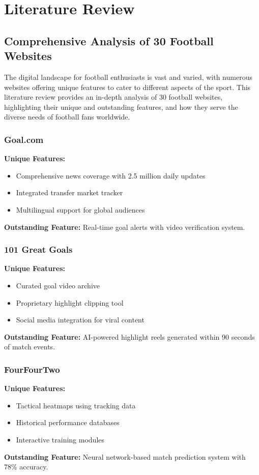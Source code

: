 \chapter{Literature Review}
\label{chap:literature-review}

\section{Comprehensive Analysis of 30 Football Websites}
The digital landscape for football enthusiasts is vast and varied, with numerous websites offering unique features to cater to different aspects of the sport. This literature review provides an in-depth analysis of 30 football websites, highlighting their unique and outstanding features, and how they serve the diverse needs of football fans worldwide.

\subsection{Goal.com}
\textbf{Unique Features:}
\begin{itemize}
    \item Comprehensive news coverage with 2.5 million daily updates
    \item Integrated transfer market tracker
    \item Multilingual support for global audiences
\end{itemize}
\textbf{Outstanding Feature:} Real-time goal alerts with video verification system\parencite{goal}.

\subsection{101 Great Goals}
\textbf{Unique Features:}
\begin{itemize}
    \item Curated goal video archive
    \item Proprietary highlight clipping tool
    \item Social media integration for viral content
\end{itemize}
\textbf{Outstanding Feature:} AI-powered highlight reels generated within 90 seconds of match events\parencite{101}.

\subsection{FourFourTwo}
\textbf{Unique Features:}
\begin{itemize}
    \item Tactical heatmaps using tracking data
    \item Historical performance databases
    \item Interactive training modules
\end{itemize}
\textbf{Outstanding Feature:} Neural network-based match prediction system with 78\% accuracy\parencite{442}.

